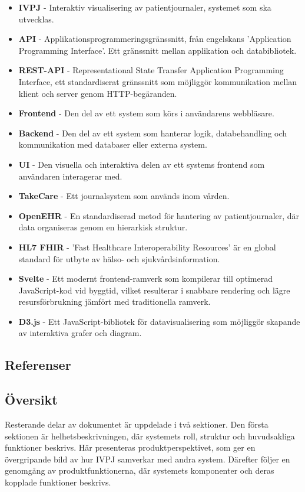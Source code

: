 \documentclass{article}
\begin{document}
\begin{itemize}
    \item \textbf{IVPJ} - Interaktiv visualisering av patientjournaler, systemet som ska utvecklas.
    \item \textbf{API} - Applikationsprogrammeringsgränssnitt, från engelskans 'Application Programming Interface'. Ett gränssnitt mellan applikation och databibliotek. 
    \item \textbf{REST-API} - Representational State Transfer Application Programming Interface, ett standardiserat gränssnitt som möjliggör kommunikation mellan klient och server genom HTTP-begäranden.
    \item \textbf{Frontend} - Den del av ett system som körs i användarens webbläsare.
    \item \textbf{Backend} - Den del av ett system som hanterar logik, databehandling och kommunikation med databaser eller externa system.
    \item \textbf{UI} - Den visuella och interaktiva delen av ett systems frontend som användaren interagerar med.
    \item \textbf{TakeCare} - Ett journalsystem som används inom vården.
    \item \textbf{OpenEHR} - En standardiserad metod för hantering av patientjournaler, där data organiseras genom en hierarkisk struktur. 
    \item \textbf{HL7 FHIR} - 'Fast Healthcare Interoperability Resources' är en global standard för utbyte av hälso- och sjukvårdsinformation.
    \item \textbf{Svelte} - Ett modernt frontend-ramverk som kompilerar till optimerad JavaScript-kod vid byggtid, vilket resulterar i snabbare rendering och lägre resursförbrukning jämfört med traditionella ramverk.
    \item \textbf{D3.js} - Ett JavaScript-bibliotek för datavisualisering som möjliggör skapande av interaktiva grafer och diagram.
\end{itemize}

\subsection{Referenser}
\renewcommand{\refname}{\vspace{-2em}}
\nocite{720574}
\printbibliography


\subsection{Översikt}
Resterande delar av dokumentet är uppdelade i två sektioner. Den första sektionen är helhetsbeskrivningen, där systemets roll, struktur och huvudsakliga funktioner beskrivs. Här presenteras produktperspektivet, som ger en övergripande bild av hur IVPJ samverkar med andra system. Därefter följer en genomgång av produktfunktionerna, där systemets komponenter och deras kopplade funktioner beskrivs.
\end{document}
